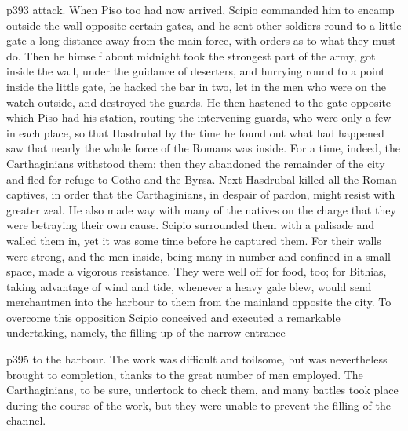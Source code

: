 p393 attack. When Piso too had now arrived, Scipio commanded him to encamp outside the wall opposite certain gates, and he sent other soldiers round to a little gate a long distance away from the main force, with orders as to what they must do. Then he himself about midnight took the strongest part of the army, got inside the wall, under the guidance of deserters, and hurrying round to a point inside the little gate, he hacked the bar in two, let in the men who were on the watch outside, and destroyed the guards. He then hastened to the gate opposite which Piso had his station, routing the intervening guards, who were only a few in each place, so that Hasdrubal by the time he found out what had happened saw that nearly the whole force of the Romans was inside. For a time, indeed, the Carthaginians withstood them; then they abandoned the remainder of the city and fled for refuge to Cotho and the Byrsa. Next Hasdrubal killed all the Roman captives, in order that the Carthaginians, in despair of pardon, might resist with greater zeal. He also made way with many of the natives on the charge that they were betraying their own cause. Scipio surrounded them with a palisade and walled them in, yet it was some time before he captured them. For their walls were strong, and the men inside, being many in number and confined in a small space, made a vigorous resistance. They were well off for food, too; for Bithias, taking advantage of wind and tide, whenever a heavy gale blew, would send merchantmen into the harbour to them from the mainland opposite the city. To overcome this opposition Scipio conceived and executed a remarkable undertaking, namely, the filling up of the narrow entrance

p395 to the harbour. The work was difficult and toilsome, but was nevertheless brought to completion, thanks to the great number of men employed. The Carthaginians, to be sure, undertook to check them, and many battles took place during the course of the work, but they were unable to prevent the filling of the channel.

